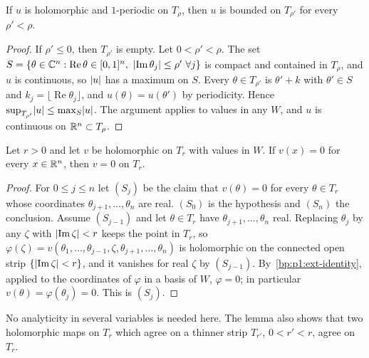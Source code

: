 \begin{lemma}\label{bp:p1:periodic-bounded}
If $u$ is holomorphic and $1$-periodic on $T_\rho$, then $u$ is bounded on $T_{\rho'}$ for every $\rho'<\rho$.
\end{lemma}

\begin{proof}
\label{step:p1:pb-compact}
If $\rho'\le0$, then $T_{\rho'}$ is empty. Let $0<\rho'<\rho$. The set
$S=\{\theta\in\C^n:\operatorname{Re}\theta\in[0,1]^n,\ \abs{\operatorname{Im}\theta_j}\le\rho'\ \forall j\}$
is compact and contained in $T_\rho$, and $u$ is continuous, so $\lvert u\rvert$ has a maximum on $S$. Every
$\theta\in T_{\rho'}$ is $\theta'+k$ with $\theta'\in S$ and $k_j=\lfloor\operatorname{Re}\theta_j\rfloor$,
and $u(\theta)=u(\theta')$ by periodicity. Hence $\sup_{T_{\rho'}}\lvert u\rvert\le\max_S\lvert u\rvert$. The argument
applies to values in any $W$, and $u$ is continuous on $\mathbb{R}^n\subset T_\rho$.
\end{proof}

\begin{lemma}\label{bp:p1:strip-identity}
Let $r>0$ and let $v$ be holomorphic on $T_r$ with values in $W$. If $v(x)=0$ for every $x\in\mathbb{R}^n$, then
$v=0$ on $T_r$.
\end{lemma}

\begin{proof}
\label{step:p1:si-induction}
For $0\le j\le n$ let $(S_j)$ be the claim that $v(\theta)=0$ for every $\theta\in T_r$ whose
coordinates $\theta_{j+1},\dots,\theta_n$ are real. $(S_0)$ is the hypothesis and $(S_n)$ the
conclusion. Assume $(S_{j-1})$ and let $\theta\in T_r$ have $\theta_{j+1},\dots,\theta_n$ real.
Replacing $\theta_j$ by any $\zeta$ with $\lvert \operatorname{Im}\zeta\rvert<r$ keeps the point in $T_r$, so
$\varphi(\zeta)=v(\theta_1,\dots,\theta_{j-1},\zeta,\theta_{j+1},\dots,\theta_n)$ is holomorphic on the
connected open strip $\{\lvert \operatorname{Im}\zeta\rvert<r\}$, and it vanishes for real $\zeta$ by
$(S_{j-1})$. By~\ref{bp:p1:ext-identity}, applied to the coordinates of $\varphi$ in a basis of $W$,
$\varphi=0$; in particular $v(\theta)=\varphi(\theta_j)=0$. This is $(S_j)$.
\end{proof}

No analyticity in several variables is needed here. The lemma also shows that two holomorphic maps on
$T_r$ which agree on a thinner strip $T_{r'}$, $0<r'<r$, agree on $T_r$.

